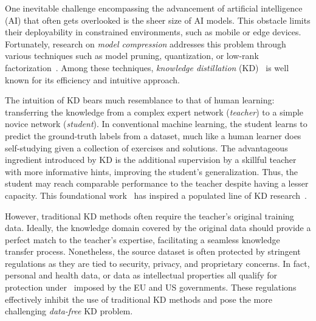 \begin{foldable} %
    One inevitable challenge encompassing the advancement of artificial intelligence (AI) that often gets overlooked is the sheer size of AI models.
    This obstacle limits their deployability in constrained environments, such as mobile or edge devices.
    Fortunately, research on \textit{ model compression} addresses this problem through various techniques such as model pruning, quantization, or low-rank factorization~\cite{gou2021knowledge}.
    Among these techniques, \textit{knowledge distillation} (KD)~\cite{hinton2015distilling} is well known for its efficiency and intuitive approach.
\end{foldable}

\begin{foldable} %
    The intuition of KD bears much resemblance to that of human learning: transferring the knowledge from a complex expert network (\textit{teacher}) to a simple novice network (\textit{student}).
    In conventional machine learning, the student learns to predict the ground-truth labels from a dataset, much like a human learner does self-studying given a collection of exercises and solutions.
    The advantageous ingredient introduced by KD is the additional supervision by a skillful teacher with more informative hints, improving the student's generalization.
    Thus, the student may reach comparable performance to the teacher despite having a lesser capacity.
    This foundational work~\cite{hinton2015distilling} has inspired a populated line of KD research~\cite{romero2015fitnets, chen2017learning, park2019relational, meng2019conditional, nguyen2021knowledge}.
\end{foldable}

\begin{foldable} %
    However, traditional KD methods often require the teacher's original training data.
    Ideally, the knowledge domain covered by the original data should provide a perfect match to the teacher's expertise, facilitating a seamless knowledge transfer process.
    Nonetheless, the source dataset is often protected by stringent regulations as they are tied to security, privacy, and proprietary concerns.
    In fact, personal and health data, or data as intellectual properties all qualify for protection under~\cite{eu2016gdpr, us1996hipaa, eu1996databasedirective, us2016dsta} imposed by the EU and US governments.
    These regulations effectively inhibit the use of traditional KD methods and pose the more challenging \textit{data-free} KD problem.
\end{foldable}

